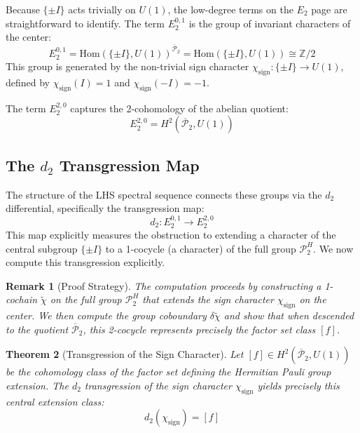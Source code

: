 \documentclass[11pt]{article}
\newtheorem{theorem}{Theorem}[section]
\newtheorem{remark}[theorem]{Remark}
\begin{document}
Because $\{\pm I\}$ acts trivially on $U(1)$, the low-degree terms on the $E_2$ page are straightforward to identify. The term $E_2^{0,1}$ is the group of invariant characters of the center:
\[
    E_2^{0,1} = \mathrm{Hom}(\{\pm I\}, U(1))^{\overline{\mathcal{P}}_2} = \mathrm{Hom}(\{\pm I\}, U(1)) \cong \mathbb{Z}/2
\]
This group is generated by the non-trivial sign character $\chi_{\text{sign}} : \{\pm I\} \rightarrow U(1)$, defined by $\chi_{\text{sign}}(I) = 1$ and $\chi_{\text{sign}}(-I) = -1$.

The term $E_2^{2,0}$ captures the 2-cohomology of the abelian quotient:
\[
    E_2^{2,0} = H^2(\overline{\mathcal{P}}_2, U(1))
\]

\subsection{The $d_2$ Transgression Map}

The structure of the LHS spectral sequence connects these groups via the $d_2$ differential, specifically the transgression map:
\[
    d_2 : E_2^{0,1} \longrightarrow E_2^{2,0}
\]
This map explicitly measures the obstruction to extending a character of the central subgroup $\{\pm I\}$ to a 1-cocycle (a character) of the full group $\mathcal{P}_2^H$. We now compute this transgression explicitly.

\begin{remark}[Proof Strategy]
The computation proceeds by constructing a 1-cochain $\tilde{\chi}$ on the full group $\mathcal{P}_2^H$ that extends the sign character $\chi_{\text{sign}}$ on the center. We then compute the group coboundary $\delta\tilde{\chi}$ and show that when descended to the quotient $\overline{\mathcal{P}}_2$, this 2-cocycle represents precisely the factor set class $[f]$.
\end{remark}

\begin{theorem}[Transgression of the Sign Character]
\label{thm:transgression}
Let $[f] \in H^2(\overline{\mathcal{P}}_2, U(1))$ be the cohomology class of the factor set defining the Hermitian Pauli group extension. The $d_2$ transgression of the sign character $\chi_{\text{sign}}$ yields precisely this central extension class:
\[
    d_2(\chi_{\text{sign}}) = [f]
\]
\end{theorem}
\end{document}
